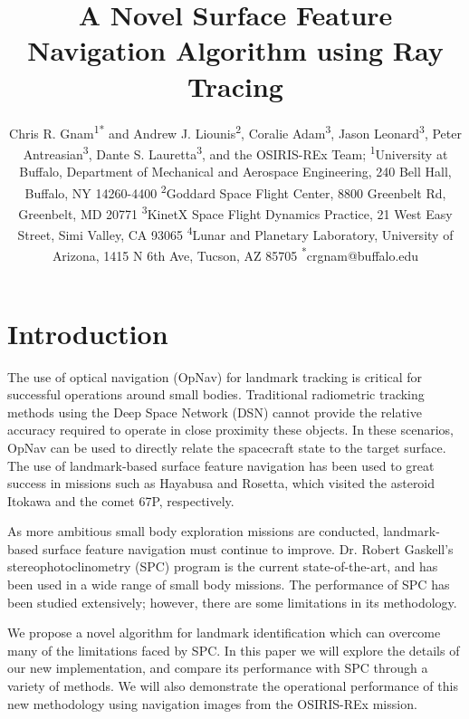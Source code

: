 \documentclass{src/RPI-SIW}
\author{
	Chris R. Gnam\textsuperscript{1}\textsuperscript{*}
	and 
	Andrew J. Liounis\textsuperscript{2},
    Coralie Adam\textsuperscript{3},
    Jason Leonard\textsuperscript{3},
    Peter Antreasian\textsuperscript{3},
    Dante S. Lauretta\textsuperscript{3},
    and the OSIRIS-REx Team;
	\textsuperscript{1}University at Buffalo, Department of Mechanical and Aerospace Engineering, 240 Bell Hall, Buffalo, NY  14260-4400
	\textsuperscript{2}Goddard Space Flight Center, 8800 Greenbelt Rd, Greenbelt, MD 20771
    \textsuperscript{3}KinetX Space Flight Dynamics Practice, 21 West Easy Street, Simi Valley, CA 93065
    \textsuperscript{4}Lunar and Planetary Laboratory, University of Arizona, 1415 N 6th Ave, Tucson, AZ 85705
	\textsuperscript{*}crgnam@buffalo.edu
}
\title{A Novel Surface Feature Navigation Algorithm using Ray Tracing}
\begin{document}
\maketitle


\section*{Introduction}
The use of optical navigation (OpNav) for landmark tracking is critical for successful operations around small bodies.  Traditional radiometric tracking methods using the Deep Space Network (DSN) cannot provide the relative accuracy required to operate in close proximity these objects.  In these scenarios, OpNav can be used to directly relate the spacecraft state to the target surface.  The use of landmark-based surface feature navigation has been used to great success in missions such as Hayabusa\cite{hayabusa} and Rosetta\cite{rosetta}, which visited the asteroid Itokawa and the comet 67P, respectively.

As more ambitious small body exploration missions are conducted, landmark-based surface feature navigation must continue to improve.  Dr. Robert Gaskell's stereophotoclinometry (SPC) program is the current state-of-the-art, and has been used in a wide range of small body missions.  The performance of SPC has been studied extensively\cite{spc_sensitiviy}; however, there are some limitations in its methodology.

We propose a novel algorithm for landmark identification which can overcome many of the limitations faced by SPC.  In this paper we will explore the details of our new implementation, and compare its performance with SPC through a variety of methods.  We will also demonstrate the operational performance of this new methodology using navigation images from the OSIRIS-REx mission.
\end{document}

